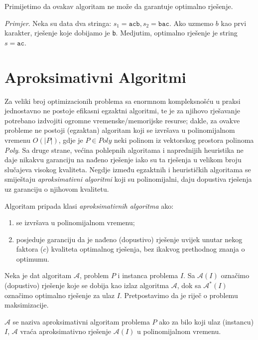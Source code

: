 \documentclass[a4paper, utf8, 11pt, colorlinks]{book}
\begin{document}
Primijetimo da ovakav algoritam ne može da garantuje optimalno rješenje. 

\noindent \emph{Primjer}.  Neka su data dva stringa: $s_1 = \texttt{acb}, s_2 = \texttt{bac}$. Ako uzmemo  $ b$ kao prvi karakter, rješenje koje dobijamo je \texttt{b}. Medjutim, optimalno rješenje je string $s=\texttt{ac}$. 

\section{Aproksimativni Algoritmi}
  
   Za veliki broj optimizacionih problema sa enormnom kompleksnošću u praksi jednostavno ne postoje efikasni egzaktni algoritmi, te je za  njihovo rješavanje potrebano izdvojiti ogromne vremenske/memorijske resurse; dakle, za  ovakve probleme ne postoji (egzaktan) algoritam koji se izvršava u polinomijalnom vremenu $O(|P|)$, gdje je $P \in {Poly}$ neki polinom iz vektorskog prostora polinoma \emph{Poly}. Sa druge strane, većina pohlepnih algoritama i naprednijih heuristika ne daje nikakvu garanciju na nađeno rješenje iako su ta rješenja u velikom broju slučajeva visokog kvaliteta. Negdje između egzaktnih i heurističkih algoritama se smiještaju \emph{aproksimativni algoritmi} koji su polinomijalni, daju dopustiva rješenja uz garanciju o njihovom kvalitetu. 
  
  \noindent Algoritam pripada klasi \emph{aproksimativnih algoritma} ako:
  \begin{enumerate}
  	\item se izvršava u polinomijalnom vremenu;
  	\item posjeduje garanciju da je nađeno (dopustivo) rješenje uvijek unutar nekog faktora ($c$) kvaliteta optimalnog rješenja, bez ikakvog prethodnog znanja o optimumu.
  \end{enumerate}
  Neka je dat algoritam $\mathcal{A}$, problem $P$ i instanca problema $I$. Sa $\mathcal{A}(I)$ označimo (dopustivo) rješenje koje se dobija kao izlaz algoritma $\mathcal{A}$, dok sa $\mathcal{A}^*(I)$ označimo optimalno rješenje za ulaz $I$. Pretpostavimo da je riječ o problemu maksimizacije. 
  
  $\mathcal{A}$ se naziva aproksimativni algoritam problema $P$ ako 
  za bilo koji ulaz (instancu) $I$, $\mathcal{A}$ vraća aproksimativno rješenje $\mathcal{A}(I)$ u polinomijalnom vremenu. 
  
\end{document}

